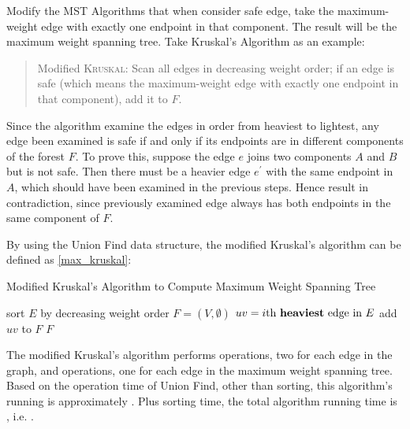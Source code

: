 \begin{homeworkProblem}

\begin{homeworkSubProblem}
Modify the MST Algorithms that when consider safe edge,
take the maximum-weight edge with exactly one endpoint
in that component. The result will be the maximum weight
spanning tree.
Take Kruskal's Algorithm as an example:

\begin{quote}
    Modified \textsc{Kruskal}: Scan all edges in decreasing
    weight order; if an edge is safe (which means the
    maximum-weight edge with exactly one endpoint in that
    component), add it to $F$.
\end{quote}

Since the algorithm examine the edges in order from heaviest
to lightest, any edge been examined is safe if and only if its
endpoints are in different components of the forest $F$. To prove
this, suppose the edge $e$ joins two components $A$ and $B$ but is
not safe. Then there must be a heavier edge $e^\prime$ with
the same endpoint in $A$, which should have been examined
in the previous steps.
Hence result in contradiction, since previously examined edge
always has both endpoints in the same component of $F$.

By using the Union Find data structure, the modified
Kruskal's algorithm can be defined as \cref{max_kruskal}:

\begin{algorithm}[H]
    \caption{Modified Kruskal's Algorithm to Compute Maximum Weight Spanning Tree}\label{max_kruskal}
    \begin{algorithmic}[1]
            \State sort $E$ by decreasing weight order
            \State $F = (V, \emptyset)$
            \EndFor
            \State $uv = i\text{th \textbf{heaviest} edge in } E$
                    \State {}
                    \State add $uv$ to $F$
                \EndIf
            \EndFor
            \Return $F$
        \EndProcedure
    \end{algorithmic}
\end{algorithm}

The modified Kruskal's algorithm performs 
 operations, two for each edge
in the graph, and  
operations, one for each edge in the maximum weight
spanning tree. Based on the operation time of Union Find,
other than sorting, this algorithm's running is
approximately . Plus 
sorting time, the total algorithm running time is
, i.e. .


\end{homeworkSubProblem}
\end{homeworkProblem}
